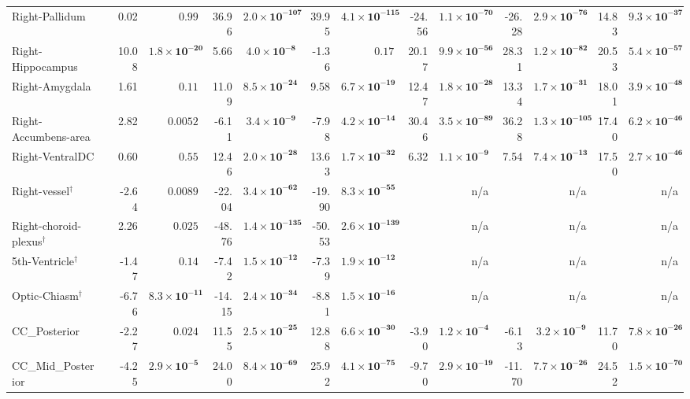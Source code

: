 {\begin{longtable}{llrrrrrrrrrrrr}
Right-Pallidum &  & 0.02 & $0.99$ & 36.96 & $\mathbf{2.0{\times}10^{-107}}$ & 39.95 & $\mathbf{4.1{\times}10^{-115}}$ & -24.56 & $\mathbf{1.1{\times}10^{-70}}$ & -26.28 & $\mathbf{2.9{\times}10^{-76}}$ & 14.83 & $\mathbf{9.3{\times}10^{-37}}$ \\
Right-Hippocampus &  & 10.08 & $\mathbf{1.8{\times}10^{-20}}$ & 5.66 & $\mathbf{4.0{\times}10^{-8}}$ & -1.36 & $0.17$ & 20.17 & $\mathbf{9.9{\times}10^{-56}}$ & 28.31 & $\mathbf{1.2{\times}10^{-82}}$ & 20.53 & $\mathbf{5.4{\times}10^{-57}}$ \\
Right-Amygdala &  & 1.61 & $0.11$ & 11.09 & $\mathbf{8.5{\times}10^{-24}}$ & 9.58 & $\mathbf{6.7{\times}10^{-19}}$ & 12.47 & $\mathbf{1.8{\times}10^{-28}}$ & 13.34 & $\mathbf{1.7{\times}10^{-31}}$ & 18.01 & $\mathbf{3.9{\times}10^{-48}}$ \\
Right-Accumbens-area &  & 2.82 & $0.0052$ & -6.11 & $\mathbf{3.4{\times}10^{-9}}$ & -7.98 & $\mathbf{4.2{\times}10^{-14}}$ & 30.46 & $\mathbf{3.5{\times}10^{-89}}$ & 36.28 & $\mathbf{1.3{\times}10^{-105}}$ & 17.40 & $\mathbf{6.2{\times}10^{-46}}$ \\
Right-VentralDC &  & 0.60 & $0.55$ & 12.46 & $\mathbf{2.0{\times}10^{-28}}$ & 13.63 & $\mathbf{1.7{\times}10^{-32}}$ & 6.32 & $\mathbf{1.1{\times}10^{-9}}$ & 7.54 & $\mathbf{7.4{\times}10^{-13}}$ & 17.50 & $\mathbf{2.7{\times}10^{-46}}$ \\
Right-vessel$^{\dagger}$ &  & -2.64 & $0.0089$ & -22.04 & $\mathbf{3.4{\times}10^{-62}}$ & -19.90 & $\mathbf{8.3{\times}10^{-55}}$ &  & n/a &  & n/a &  & n/a \\
Right-choroid-plexus$^{\dagger}$ &  & 2.26 & $0.025$ & -48.76 & $\mathbf{1.4{\times}10^{-135}}$ & -50.53 & $\mathbf{2.6{\times}10^{-139}}$ &  & n/a &  & n/a &  & n/a \\
5th-Ventricle$^{\dagger}$ &  & -1.47 & $0.14$ & -7.42 & $\mathbf{1.5{\times}10^{-12}}$ & -7.39 & $\mathbf{1.9{\times}10^{-12}}$ &  & n/a &  & n/a &  & n/a \\
Optic-Chiasm$^{\dagger}$ &  & -6.76 & $\mathbf{8.3{\times}10^{-11}}$ & -14.15 & $\mathbf{2.4{\times}10^{-34}}$ & -8.81 & $\mathbf{1.5{\times}10^{-16}}$ &  & n/a &  & n/a &  & n/a \\
CC\_Posterior &  & -2.27 & $0.024$ & 11.55 & $\mathbf{2.5{\times}10^{-25}}$ & 12.88 & $\mathbf{6.6{\times}10^{-30}}$ & -3.90 & $\mathbf{1.2{\times}10^{-4}}$ & -6.13 & $\mathbf{3.2{\times}10^{-9}}$ & 11.70 & $\mathbf{7.8{\times}10^{-26}}$ \\
CC\_Mid\_Posterior &  & -4.25 & $\mathbf{2.9{\times}10^{-5}}$ & 24.00 & $\mathbf{8.4{\times}10^{-69}}$ & 25.92 & $\mathbf{4.1{\times}10^{-75}}$ & -9.70 & $\mathbf{2.9{\times}10^{-19}}$ & -11.70 & $\mathbf{7.7{\times}10^{-26}}$ & 24.52 & $\mathbf{1.5{\times}10^{-70}}$ \\

\end{longtable}}

